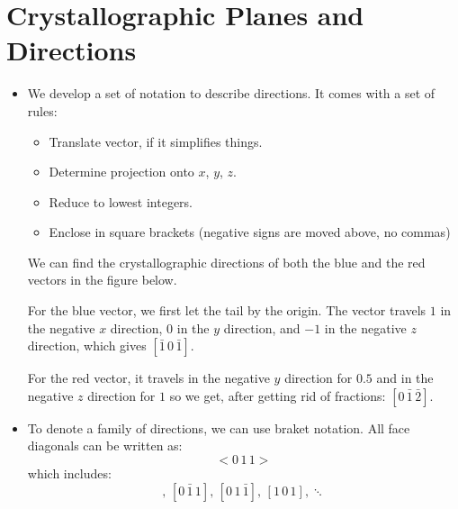 \section{Crystallographic Planes and Directions}
\begin{itemize}
    \item We develop a set of notation to describe directions. It comes with a set of rules:
    \begin{itemize}
        \item Translate vector, if it simplifies things.
        \item Determine projection onto $x$, $y$, $z$.
        \item Reduce to lowest integers.
        \item Enclose in square brackets (negative signs are moved above, no commas)
    \end{itemize}
    \begin{example}
        We can find the crystallographic directions of both the blue and the red vectors in the figure below.
        \begin{center}
        \end{center}
        For the blue vector, we first let the tail by the origin. The vector travels $1$ in the negative $x$ direction, $0$ in the $y$ direction, and $-1$ in the negative $z$ direction, which gives $[\bar{1}\,0\,\bar{1}]$.
        \vspace{2mm}

        For the red vector, it travels in the negative $y$ direction for $0.5$ and in the negative $z$ direction for $1$ so we get, after getting rid of fractions: $[0\,\bar{1}\,\bar{2}]$.
    \end{example}
    \item To denote a family of directions, we can use braket notation. All face diagonals can be written as:
    \begin{equation}
        <0\,1\,1>
    \end{equation}
    which includes:
    \begin{equation}
        [0\,1\,1],\, [0\,\bar{1}\,1],\, [0\,1\,\bar{1}],\, [1\,0\,1], \ddots
    \end{equation}
\end{itemize}